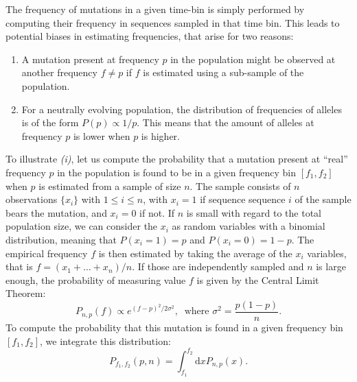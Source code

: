 \documentclass[reprint,amsmath,amssymb,superscriptaddress,showpacs,rmp]{revtex4-1}
\begin{document}
	The frequency of mutations in a given time-bin is simply performed by computing their frequency in sequences sampled in that time bin.
	This leads to potential biases in estimating frequencies, that arise for two reasons:
	\begin{enumerate}[label=(\roman*)]
		\item A mutation present at frequency $p$ in the population might be observed at another frequency $f\neq p$ if $f$ is estimated using a sub-sample of the population.
		\item For a neutrally evolving population, the distribution of frequencies of alleles is of the form $P(p)\propto 1/p$. This means that the amount of alleles at frequency $p$ is lower when $p$ is higher.
	\end{enumerate}
	To illustrate \emph{(i)}, let us compute the probability that a mutation present at ``real'' frequency $p$ in the population is found to be in a given frequency bin $[f_1,f_2]$ when $p$ is estimated from a sample of size $n$.
	The sample consists of $n$ observations $\{x_i\}$ with $1\leq i\leq n$, with $x_i=1$ if sequence sequence $i$ of the sample bears the mutation, and $x_i=0$ if not.
	If $n$ is small with regard to the total population size, we can consider the $x_i$ as random variables with a binomial distribution, meaning that $P(x_i=1)=p$ and $P(x_i=0) = 1-p$.
	The empirical frequency $f$ is then estimated by taking the average of the $x_i$ variables, that is $f = (x_1 + \ldots + x_n)/n$.
	If those are independently sampled and $n$ is large enough, the probability of measuring value $f$ is given by the Central Limit Theorem:
	\begin{equation}
		P_{n,p}(f) \propto e^{(f - p)^2 / 2\sigma^2},\;\; \text{where } \sigma^2 = \frac{p(1-p)}{n}.
		\label{eq:ctl}
	\end{equation}
	To compute the probability that this mutation is found in a given frequency bin $[f_1,f_2]$, we integrate this distribution:
	\begin{equation}
		P_{f_1,f_2}(p,n) = \int_{f_1}^{f_2}\text{d}x P_{n,p}(x). %
		\label{eq:pinterval}
	\end{equation}
\end{document}
